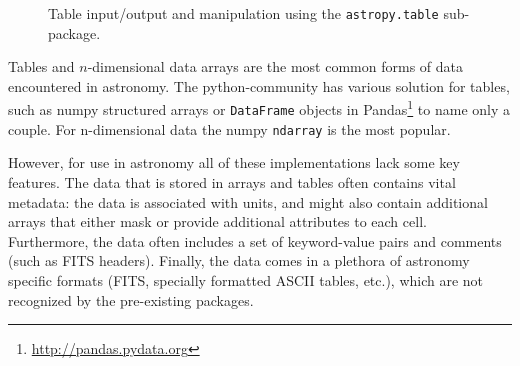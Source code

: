 \documentclass[traditabstract]{aa}
\begin{document}
\begin{figure}
\center
\caption{Table input/output and manipulation using the \texttt{astropy.table}
sub-package.\label{code:tables}}
\vspace{0.1in}
\end{figure}

Tables and $n$-dimensional data arrays are the most common forms of data
encountered in astronomy. The \gls{python}-community has various solution for
tables, such as \gls{numpy} structured arrays or \texttt{DataFrame} objects in
Pandas\footnote{\url{http://pandas.pydata.org}} to name only a couple. For
n-dimensional data the \gls{numpy} \texttt{ndarray} is the most popular.

However, for use in astronomy all of these implementations lack some key
features. The data that is stored in arrays and tables often contains vital
metadata: the data is associated with units, and might also contain additional
arrays that either mask or provide additional attributes to each cell.
Furthermore, the data often includes a set of keyword-value pairs and comments (such as FITS headers).
Finally, the data comes in a plethora of astronomy specific formats (FITS,
specially formatted ASCII tables, etc.), which are not recognized by the
pre-existing packages.
\end{document}
